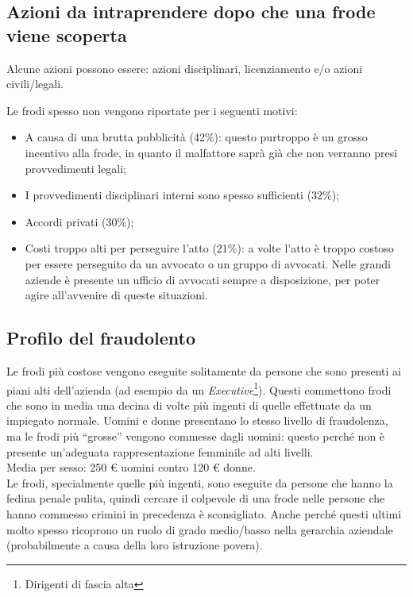 \subsection{Azioni da intraprendere dopo che una frode viene scoperta}

Alcune azioni possono essere: azioni disciplinari, licenziamento e/o azioni 
civili/legali.

Le frodi spesso non vengono riportate per i seguenti motivi:
\begin{itemize}
  \item A causa di una brutta pubblicità (42\%): questo purtroppo è un grosso 
  incentivo alla frode, in quanto il malfattore
  saprà già che non verranno presi provvedimenti legali;
  \item I provvedimenti disciplinari interni sono spesso sufficienti (32\%);
  \item Accordi privati (30\%);
  \item Costi troppo alti per perseguire l'atto (21\%): a volte l'atto è troppo 
  costoso per essere perseguito da un avvocato o un
  gruppo di avvocati. Nelle grandi aziende è presente un ufficio di avvocati
  sempre a disposizione, per poter agire all'avvenire di queste situazioni.
\end{itemize}

\subsection{Profilo del fraudolento}

Le frodi più costose vengono eseguite solitamente da persone che sono presenti
ai piani alti dell'azienda (ad esempio da un \textit{Executive}\footnote{Dirigenti 
di fascia alta}). Questi commettono frodi che sono in media una decina di volte
più ingenti di quelle effettuate da un impiegato normale. Uomini e donne presentano 
lo stesso livello di fraudolenza, ma le frodi più ``grosse'' vengono commesse dagli 
uomini: questo perché non è presente un'adeguata rappresentazione femminile ad 
alti livelli.\\
\newline
Media per sesso: 250 \euro{} uomini contro 120 \euro{} donne.\\
\newline
Le frodi, specialmente quelle più ingenti, sono eseguite da persone che hanno la fedina
penale pulita, quindi cercare il colpevole di una frode nelle persone che hanno commesso
 crimini in precedenza è sconsigliato. Anche perché questi ultimi molto spesso ricoprono 
un ruolo di grado medio/basso nella gerarchia aziendale (probabilmente a causa della 
loro istruzione povera).

